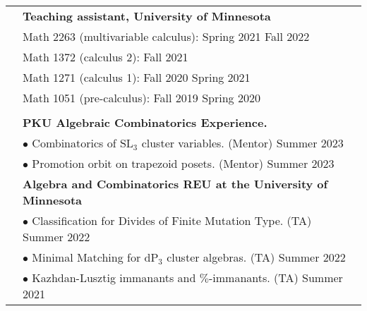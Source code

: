 \documentclass[letterpaper, 11pt,times]{article}
\newcommand{\mycolor}[0]{\color{RoyalBlue}}
\newlength{\myl}
\newcommand{\ind}[0]{\hspace{\myl}}
\newlength{\newl}
\begin{document}
\begin{longtable}{p{1in}p{5in}}

{\mycolor{Teaching}} 
& \textbf{Teaching assistant, University of Minnesota}  \\
&\ind  Math 2263 (multivariable calculus): Spring 2021 Fall 2022\\
&\ind  Math 1372 (calculus 2): Fall 2021\\
&\ind  Math 1271 (calculus 1): Fall 2020 Spring 2021\\
&\ind  Math 1051 (pre-calculus): Fall 2019 Spring 2020\\
\\
{\mycolor{Mentoring}} 
&\textbf{PKU Algebraic Combinatorics Experience.}\\

&\ind $\bullet$ Combinatorics of $\text{SL}_3$ cluster variables. (Mentor) \hfill Summer 2023\\
&\ind $\bullet$ Promotion orbit on trapezoid posets. (Mentor) \hfill Summer 2023\\
& \textbf{Algebra and Combinatorics REU at the University of Minnesota}  \\
&\ind $\bullet$ Classification for Divides of Finite Mutation Type. (TA)  \hfill Summer 2022\\
&\ind $\bullet$ Minimal Matching for $\text{dP}_3$ cluster algebras. (TA) \hfill Summer 2022\\
&\ind  $\bullet$ Kazhdan-Lusztig immanants and $\%$-immanants. (TA) \hfill Summer 2021\\




\end{longtable}
\end{document}
